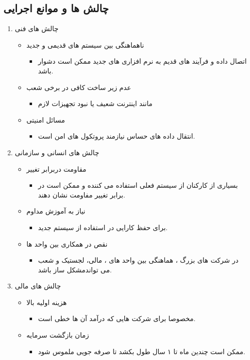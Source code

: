 \documentclass[12pt,a4paper]{report}
\begin{document}
\subsection{چالش ها و موانع اجرایی}
\begin{enumerate}
	\item چالش های فنی 
	\begin{itemize}
		\item ناهماهنگی بین سیستم های قدیمی و جدید
		\begin{itemize}
			\item اتصال داده و فرآیند های قدیم به نرم افزاری های  جدید ممکن است دشوار باشد.
		\end{itemize}
			\item عدم زیر ساخت کافی در برخی شعب
		\begin{itemize}
			\item مانند اینترنت شعیف یا نبود تجهیزات لازم
		\end{itemize}
			\item مسائل امنیتی
		\begin{itemize}
			\item 
			انتقال داده های حساس نیازمند پروتکول های امن است.
		\end{itemize}
	\end{itemize}
	\item 
چالش های انسانی و سازمانی
\begin{itemize}
	\item 
مقاومت دربرابر تغییر
	\begin{itemize}
		\item 
بسیاری از کارکنان از سیستم فعلی استفاده می کننده و ممکن است در برابر تغییر مفاومت نشان دهند.
	\end{itemize}
		\item نیاز به آموزش مداوم
	\begin{itemize}
		\item 
برای حفظ کارایی در استفاده از سیستم جدید.
	\end{itemize}
		\item نقص در همکاری بین واحد ها
	\begin{itemize}
		\item 
در شرکت های بزرگ ، هماهنگی بین  واحد های ، مالی، لجستیک و شعب می تواندمشکل ساز باشد.
	\end{itemize}
\end{itemize}
	\newpage
	\item 
چالش های مالی
\begin{itemize}
	\item 
هزینه اولیه بالا
	\begin{itemize}
		\item 
مخصوصا برای شرکت هایی که درآمد آن ها خطی است.
	\end{itemize}
		\item زمان بازگشت سرمایه
	\begin{itemize}
		\item 
	ممکن است چندین ماه تا ۱ سال طول بکشد تا صرفه جویی ملموس شود.
	\end{itemize}
\end{itemize}


\end{enumerate}
\end{document}
